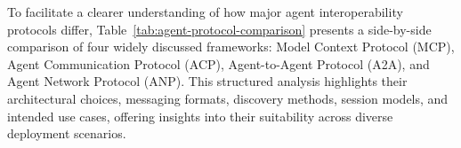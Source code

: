 \documentclass{article}
\begin{document}
To facilitate a clearer understanding of how major agent interoperability protocols differ, Table~\ref{tab:agent-protocol-comparison} presents a side-by-side comparison of four widely discussed frameworks: Model Context Protocol (MCP), Agent Communication Protocol (ACP), Agent-to-Agent Protocol (A2A), and Agent Network Protocol (ANP). This structured analysis highlights their architectural choices, messaging formats, discovery methods, session models, and intended use cases, offering insights into their suitability across diverse deployment scenarios.









\end{document}
